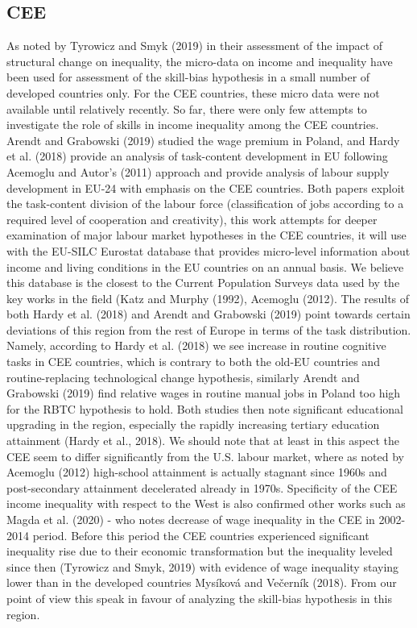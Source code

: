 \documentclass{article}
\begin{document}
\subsection{CEE}
As noted by Tyrowicz and Smyk (2019) in their assessment of the impact of structural change on inequality, the micro-data on income and inequality have been used for assessment of the skill-bias hypothesis in a small number of developed countries only. For the CEE countries, these micro data were not available until relatively recently.
So far, there were only few attempts to investigate the role of skills in income inequality among the CEE countries. Arendt and Grabowski (2019) studied the wage premium in Poland, and Hardy et al. (2018) provide an analysis of task-content development in EU following Acemoglu and Autor's (2011) approach and provide analysis of labour supply development in EU-24 with emphasis on the CEE countries. Both papers exploit the task-content division of the labour force (classification of jobs according to a required level of cooperation and creativity), this work attempts for deeper examination of major labour market hypotheses in the CEE countries, it will use with the EU-SILC Eurostat database that provides micro-level information about income and living conditions in the EU countries on an annual basis. We believe this database is the closest to the Current Population Surveys data used by the key works in the field (Katz and Murphy (1992), Acemoglu (2012).
The results of both Hardy et al. (2018) and Arendt and Grabowski (2019)  point towards certain deviations of this region from the rest of Europe in terms of the task distribution. Namely, according to Hardy et al. (2018) we see increase in routine cognitive tasks in CEE countries, which is contrary to both the old-EU countries and routine-replacing technological change hypothesis, similarly Arendt and Grabowski (2019) find relative wages in routine manual jobs in Poland too high for the RBTC hypothesis to hold. Both studies then note significant educational upgrading in the region, especially the rapidly increasing tertiary education attainment (Hardy et al., 2018). We should note that at least in this aspect the CEE seem to differ significantly from the U.S. labour market, where as noted by Acemoglu (2012) high-school attainment is actually stagnant since 1960s and post-secondary attainment decelerated already in 1970s. Specificity of the CEE income inequality with respect to the West is also confirmed other works such as Magda et al. (2020) - who notes decrease of wage inequality in the CEE in 2002-2014 period. Before this period the CEE countries experienced significant inequality rise due to their economic transformation but the inequality leveled since then (Tyrowicz and Smyk, 2019) with evidence of wage inequality staying lower than in the developed countries Mysíková and Večerník (2018). From our point of view this speak in favour of analyzing the skill-bias hypothesis in this region.
\end{document}
